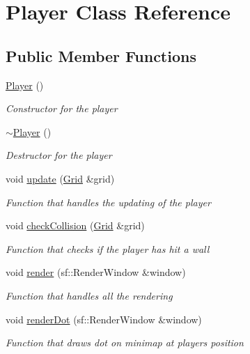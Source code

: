\hypertarget{class_player}{}\section{Player Class Reference}
\label{class_player}
\subsection*{Public Member Functions}
\begin{DoxyCompactItemize}
\item 
\mbox{\hyperlink{class_player_affe0cc3cb714f6deb4e62f0c0d3f1fd8}{Player}} ()
\begin{DoxyCompactList}\small\item\em Constructor for the player \end{DoxyCompactList}\item 
\mbox{\hyperlink{class_player_a749d2c00e1fe0f5c2746f7505a58c062}{$\sim$\+Player}} ()
\begin{DoxyCompactList}\small\item\em Destructor for the player \end{DoxyCompactList}\item 
void \mbox{\hyperlink{class_player_a7fcc5871cfe1131a4ab757b6017350c1}{update}} (\mbox{\hyperlink{class_grid}{Grid}} \&grid)
\begin{DoxyCompactList}\small\item\em Function that handles the updating of the player \end{DoxyCompactList}\item 
void \mbox{\hyperlink{class_player_ac486bbf1b2b679490c29e096b8d3617e}{check\+Collision}} (\mbox{\hyperlink{class_grid}{Grid}} \&grid)
\begin{DoxyCompactList}\small\item\em Function that checks if the player has hit a wall \end{DoxyCompactList}\item 
void \mbox{\hyperlink{class_player_a53938857e80374e79726309e78d1c15c}{render}} (sf\+::\+Render\+Window \&window)
\begin{DoxyCompactList}\small\item\em Function that handles all the rendering \end{DoxyCompactList}\item 
void \mbox{\hyperlink{class_player_abadef6be9285e458e5e7e859f4c045d1}{render\+Dot}} (sf\+::\+Render\+Window \&window)
\begin{DoxyCompactList}\small\item\em Function that draws dot on minimap at players position \end{DoxyCompactList}\item 

\end{DoxyCompactItemize}
